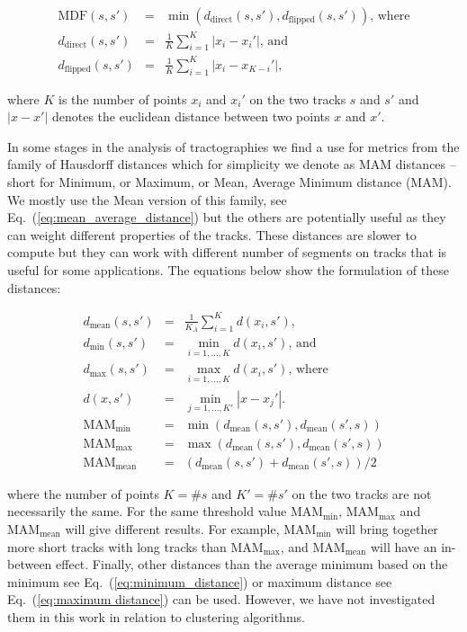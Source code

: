 \documentclass[preprint,authoryear,a4paper,10pt,onecolumn]{elsarticle}
\begin{document}
\begin{eqnarray}
\textrm{MDF}(s,s') & = & \min(d_{\textrm{direct}}(s,s'),d_{\textrm{flipped}}(s,s')),\,\textrm{where}\nonumber\\
d_{\textrm{direct}}(s,s') & = & \frac{1}{K}\sum_{i=1}^{K}|x_{i}-x_{i}'|,\,\textrm{and}\label{eq:direct_flip_distance} \\
d_{\textrm{flipped}}(s,s') & = & \frac{1}{K}\sum_{i=1}^{K}|x_{i}-x_{K-i}'|,\nonumber
\end{eqnarray}

\noindent
where $K$ is the number of points $x_{i}$ and $x_{i}'$ on the two tracks $s$ and $s'$
and $|x-x'|$ denotes the euclidean distance between two points $x$ and
$x'$.

In some stages in the analysis of tractographies we find a use for metrics from the family of Hausdorff distances
which for simplicity we denote as MAM distances -- short for Minimum,
or Maximum, or Mean, Average Minimum distance (MAM). We mostly use
the Mean version of this family, see Eq.~(\ref{eq:mean_average_distance})
but the others are potentially useful as they can weight different
properties of the tracks. These distances are slower to compute but
they can work with different number of segments on tracks that is
useful for some applications. The equations below show the formulation
of these distances:

\begin{eqnarray}
d_{\textrm{mean}}(s,s') & = & \frac{1}{K_{A}}\sum_{i=1}^{K}d(x_{i},s'),\nonumber \\
d_{\textrm{min}}(s,s') & = & \min_{i=1,...,K}d(x_{i},s'),\,\textrm{and}\label{eq:minimum_distance}\\
d_{\textrm{max}}(s,s') & = & \max_{i=1,...,K }d(x_{i},s'),\,\textrm{where}\label{eq:maximum distance}\\
d(x,s') & = & \min_{j=1,...,K'}|x-x_{j}'|.\nonumber \\
\textrm{MAM}_{\textrm{min}} & = & \min(d_{\textrm{mean}}(s,s'),d_{\textrm{mean}}(s',s))\label{eq:min_average_distance}\\
\textrm{MAM}_{\textrm{max}} & = & \max(d_{\textrm{mean}}(s,s'),d_{\textrm{mean}}(s',s))\nonumber \\
\textrm{MAM}_{\textrm{mean}} & = & (d_{\textrm{mean}}(s,s')+d_{\textrm{mean}}(s',s))/2\label{eq:mean_average_distance}\end{eqnarray}


\noindent
where the number of points $K=\#s$ and $K'=\#s'$ on the two tracks
are not necessarily the same. For the same threshold value $\textrm{MAM}_{\textrm{min}}$,
$\textrm{MAM}_{\textrm{max}}$ and $\textrm{MAM}_{\textrm{mean}}$
will give different results. For example, $\textrm{MAM}_{\textrm{min}}$ will
bring together more short tracks with long tracks than $\textrm{MAM}_{\textrm{max}}$,
and 
$\textrm{MAM}_{\textrm{mean}}$ 
will have an in-between effect. Finally, other distances than the average
minimum based on the minimum see Eq.~(\ref{eq:minimum_distance})
or maximum distance see Eq.~(\ref{eq:maximum distance}) can be used.
However, we have not investigated them in this work in relation to
clustering algorithms.
\end{document}
